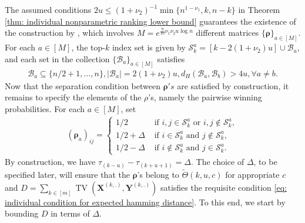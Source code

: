 \documentclass[letterpaper,12pt]{article}
\numberwithin{equation}{section}
\theoremstyle{plain}
\numberwithin{Theorem}{section}
\numberwithin{corollary}{section}
\numberwithin{proposition}{section}
\numberwithin{Lemma}{section}
{
	\theoremstyle{definition}
	\newtheorem{Definition}{Definition}
	\newtheorem{example}{Example}
	\numberwithin{example}{section}
	\newtheorem{fact}{Fact}
	\numberwithin{fact}{section}
	\newtheorem{remark}{Remark}
}
\newcommand{\1}{\mathbbm{1}}
\begin{document}
The assumed conditions $2u \leq (1 + \nu_2)^{-1}\min\{n^{1-\nu_1}, k, n-k\}$ in Theorem \ref{thm: individual nonparametric ranking lower bound} guarantees the existence of the construction by \cite{shah2017simple}, which involves $M = e^{\frac{9}{10}\nu_1\nu_2 u \log n}$ different matrices $\{\bm \rho\}_{a \in [M]}$. For each $a \in [M]$, the top-$k$ index set is given by $\mathcal S^a_k = [k - 2(1+\nu_2)u] \cup \mathcal B_a$, and each set in the collection $\{\mathcal B_a\}_{a \in [M]}$ satisfies 
\begin{align*}
	\mathcal B_a \subseteq \{n/2 + 1, \ldots, n\}, |\mathcal B_a| = 2(1+\nu_2)u, d_H(\mathcal B_a, \mathcal B_b) > 4u, \forall a \neq b. 
\end{align*} 
Now that the separation condition between $\bm \rho's$ are satisfied by construction, it remains to specify the elements of the $\rho$'s, namely the pairwise winning probabilities. For each $a \in [M]$, set
\begin{align*}
	(\bm \rho_a)_{ij} = \begin{cases}
		1/2 &\text{ if } i, j \in \mathcal S^a_k \text{ or } i, j \not \in \mathcal S^a_k,\\
		1/2 + \Delta &\text{ if } i \in \mathcal S^a_k \text{ and } j \not \in \mathcal S^a_k,\\
		1/2 - \Delta &\text{ if } i \not \in \mathcal S^a_k \text{ and } j \in \mathcal S^a_k.
	\end{cases}
\end{align*}
By construction, we have $\tau_{(k-u)} - \tau_{(k+u+1)} = \Delta$. The choice of $\Delta$, to be specified later, will ensure that the $\bm \rho$'s belong to $\widetilde \Theta(k, u, c)$ for appropriate $c$ and $D = \sum_{k \in [m]} \operatorname{TV}(\bm X^{(k,.)}, \bm Y^{(k,.)})$ satisfies the requisite condition \eqref{eq: individual condition for expected hamming distance}. To this end, we start by bounding $D$ in terms of $\Delta$. 
\end{document}
